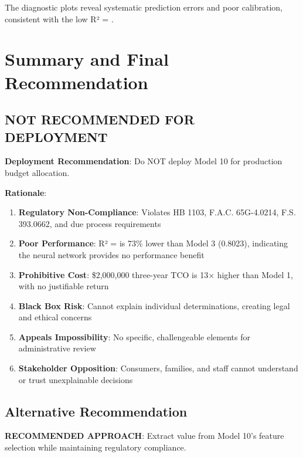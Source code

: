 The diagnostic plots reveal systematic prediction errors and poor calibration, consistent with the low R² = \ModelTenRSquaredTest{}.

\section{Summary and Final Recommendation}

\subsection{NOT RECOMMENDED FOR DEPLOYMENT}

\textbf{Deployment Recommendation}: Do NOT deploy Model 10 for production budget allocation.

\textbf{Rationale}:

\begin{enumerate}
    \item \textbf{Regulatory Non-Compliance}: Violates HB 1103, F.A.C. 65G-4.0214, F.S. 393.0662, and due process requirements
    
    \item \textbf{Poor Performance}: R² = \ModelTenRSquaredTest{} is 73\% lower than Model 3 (0.8023), indicating the neural network provides no performance benefit
    
    \item \textbf{Prohibitive Cost}: \$2,000,000 three-year TCO is 13× higher than Model 1, with no justifiable return
    
    \item \textbf{Black Box Risk}: Cannot explain individual determinations, creating legal and ethical concerns
    
    \item \textbf{Appeals Impossibility}: No specific, challengeable elements for administrative review
    
    \item \textbf{Stakeholder Opposition}: Consumers, families, and staff cannot understand or trust unexplainable decisions
\end{enumerate}

\subsection{Alternative Recommendation}

\textbf{RECOMMENDED APPROACH}: Extract value from Model 10's feature selection while maintaining regulatory compliance.

